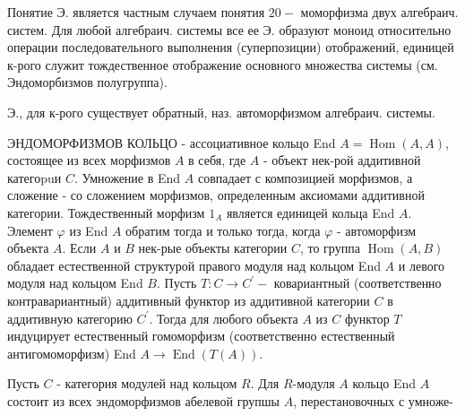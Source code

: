 \documentclass[10pt]{article}
\begin{document}
Понятие Э. является частным случаем понятия $20-$ моморфизма двух алгебраич. систем. Для любой алгебраич. системы все ее Э. образуют моноид относительно операции последовательного выполнения (суперпозиции) отображений, единицей к-рого служит тождественное отображение основного множества системы (см. Эндоморбизмов полугруппа).



Э., для к-рого существует обратный, наз. автоморфизмом алгебраич. системы.



ЭНДОМОРФИЗМОВ КОЛЬЦО - ассоциативное кольцо End $A=\operatorname{Hom}(A, A)$, состоящее из всех морфизмов $A$ в себя, где $A$ - объект нек-рой аддитивной категоpuи $C$. Умножение в End $A$ совпадает с композицией морфизмов, а сложение - со сложением морфизмов, определенным аксиомами аддитивной категории. Тождественный морфизм $1_{A}$ является единицей кольца End $A$. Элемент $\varphi$ из End $A$ обратим тогда и только тогда, когда $\varphi$ - автоморфизм объекта $A$. Если $A$ и $B$ нек-рые объекты категории $C$, то группа $\operatorname{Hom}(A, B)$ обладает естественной структурой правого модуля над кольцом End $A$ и левого модуля над кольцом End $B$. Пусть $T: C \rightarrow C^{\prime}-$ ковариантный (соответственно контравариантный) аддитивный функтор из аддитивной категории $C$ в аддитивную категорию $C^{\prime}$. Тогда для любого объекта $A$ из $C$ функтор $T$ индуцирует естественный гомоморфизм (соответственно естественный антигомоморфизм) End $A \rightarrow \operatorname{End}(T(A))$.



Пусть $C$ - категория модулей над кольцом $R$. Для $R$-модуля $A$ кольцо End $A$ состоит из всех эндоморфизмов абелевой групшы $A$, перестановочных с умноже-
\end{document}
